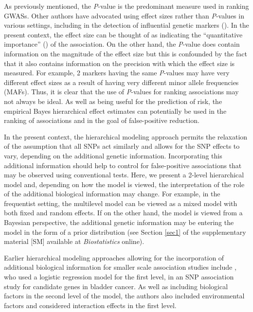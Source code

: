 \documentclass[oupdraft]{bio}
\begin{document}
As previously mentioned, the \textit{P}-value is the predominant
measure used in ranking GWASs. Other authors have advocated
using effect sizes rather than \textit{P}-values in various
settings, including in the detection of influential genetic
markers
(\citealp{rieger2004,tomlins2005,TTC01}).
In the present context, the effect size can
be thought of as indicating the ``quantitative importance''
(\citealp{Gichangi_Vach:2006})
of the association. On the other hand, the \textit{P}-value
does contain information on the magnitude of the effect
size but this is confounded by the fact that it also
contains information on the precision with which the effect
size is measured. For example, 2 markers having the same
\textit{P}-values may have very different effect sizes as a
result of having very different minor allele frequencies (MAFs).
Thus, it is clear that the use of \textit{P}-values for ranking
associations may not always be ideal. As well as being useful for
the prediction of risk, the empirical Bayes hierarchical effect
estimates can potentially be used in the ranking of associations
and in the goal of false-positive reduction.

In the present context, the hierarchical modeling approach
permits the relaxation of the assumption that all SNPs act
similarly and allows for the SNP effects to vary, depending on
the additional genetic information. Incorporating this additional
information should help to control for false-positive associations
that may be observed using conventional tests. Here, we present
a 2-level hierarchical model and, depending on how the model
is viewed, the interpretation of the role of the additional
biological information may change. For example, in the
frequentist setting, the multilevel model can be viewed as a
mixed model with both fixed and random effects. If on the other
hand, the model is viewed from a Bayesian perspective, the
additional genetic information may be entering the model in
the form of a prior distribution (see Section \ref{sec1} of
the supplementary material [SM] available at
\textit{Biostatistics} online).

Earlier hierarchical modeling approaches allowing for the
incorporation of additional biological information for smaller
scale association studies include
\citet{Barlow_Bartholomew:1972},
who used a logistic regression model for the first level,
in an SNP association study for candidate genes in bladder
cancer. As well as including biological factors in the second
level of the model, the authors also included environmental
factors and considered interaction effects in the first level.
\end{document}
